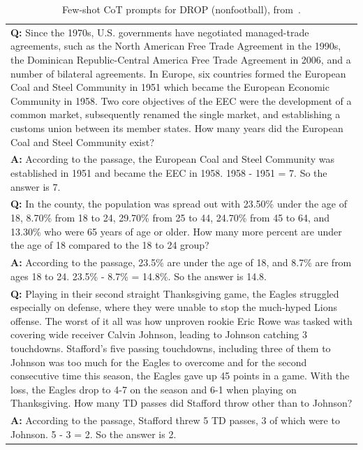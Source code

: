 \begin{table}[h]
    \caption{
    Few-shot CoT prompts for DROP (nonfootball), from~\cite{Zhou2022LeasttoMostPE}.
    }
    \centering
    \small
    \begin{tabular}{p{13.5cm}}
        \toprule
        \textbf{Q:} Since the 1970s, U.S. governments have negotiated managed-trade agreements, such as the North American Free Trade Agreement in the 1990s, the Dominican Republic-Central America Free Trade Agreement in 2006, and a number of bilateral agreements. In Europe, six countries formed the European Coal and Steel Community in 1951 which became the European Economic Community in 1958. Two core objectives of the EEC were the development of a common market, subsequently renamed the single market, and establishing a customs union between its member states. How many years did the European Coal and Steel Community exist? \\
        \vspace{-1mm}
        \textbf{A:} According to the passage, the European Coal and Steel Community was established in 1951 and became the EEC in 1958. 1958 - 1951 = 7. So the answer is 7. \\
        \vspace{0mm}
        \textbf{Q:} In the county, the population was spread out with 23.50\% under the age of 18, 8.70\% from 18 to 24, 29.70\% from 25 to 44, 24.70\% from 45 to 64, and 13.30\% who were 65 years of age or older. How many more percent are under the age of 18 compared to the 18 to 24 group? \\
        \vspace{-1mm}
        \textbf{A:} According to the passage, 23.5\% are under the age of 18, and 8.7\% are from ages 18 to 24. 23.5\% - 8.7\% = 14.8\%. So the answer is 14.8. \\
        \vspace{0mm}
        \textbf{Q:} Playing in their second straight Thanksgiving game, the Eagles struggled especially on defense, where they were unable to stop the much-hyped Lions offense. The worst of it all was how unproven rookie Eric Rowe was tasked with covering wide receiver Calvin Johnson, leading to Johnson catching 3 touchdowns. Stafford's five passing touchdowns, including three of them to Johnson was too much for the Eagles to overcome and for the second consecutive time this season, the Eagles gave up 45 points in a game. With the loss, the Eagles drop to 4-7 on the season and 6-1 when playing on Thanksgiving. How many TD passes did Stafford throw other than to Johnson? \\
        \vspace{-1mm}
        \textbf{A:} According to the passage, Stafford threw 5 TD passes, 3 of which were to Johnson. 5 - 3 = 2. So the answer is 2. \\
        \bottomrule
    \end{tabular}
    \label{tab:prompt-dropnf}
\end{table}

